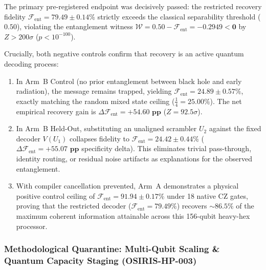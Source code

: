 \documentclass[aps,preprint,superscriptaddress,longbibliography]{revtex4-2}
\begin{document}
The primary pre-registered endpoint was decisively passed: the restricted recovery fidelity $\mathcal{F}_{\mathrm{ent}} = \mathbf{79.49 \pm 0.14\%}$ strictly exceeds the classical separability threshold ($0.50$), violating the entanglement witness $\mathcal{W} = 0.50 - \mathcal{F}_{\mathrm{ent}} = \mathbf{-0.2949 < 0}$ by $Z > 200\sigma$ ($p < 10^{-100}$). 

Crucially, both negative controls confirm that recovery is an active quantum decoding process:
\begin{enumerate}
\item In Arm~B Control (no prior entanglement between black hole and early radiation), the message remains trapped, yielding $\mathcal{F}_{\mathrm{ent}} = 24.89 \pm 0.57\%$, exactly matching the random mixed state ceiling ($\frac{1}{4} = 25.00\%$). The net empirical recovery gain is $\Delta \mathcal{F}_{\mathrm{ent}} = \mathbf{+54.60\text{ pp}}$ ($Z = 92.5\sigma$).
\item In Arm~B Held-Out, substituting an unaligned scrambler $U_2$ against the fixed decoder $V(U_1)$ collapses fidelity to $\mathcal{F}_{\mathrm{ent}} = 24.42 \pm 0.44\%$ ($\Delta \mathcal{F}_{\mathrm{ent}} = \mathbf{+55.07\text{ pp}}$ specificity delta). This eliminates trivial pass-through, identity routing, or residual noise artifacts as explanations for the observed entanglement.
\item With compiler cancellation prevented, Arm~A demonstrates a physical positive control ceiling of $\mathcal{F}_{\mathrm{ent}} = \mathbf{91.94 \pm 0.17\%}$ under 18 native CZ gates, proving that the restricted decoder ($\mathcal{F}_{\mathrm{ent}} = 79.49\%$) recovers $\sim 86.5\%$ of the maximum coherent information attainable across this 156-qubit heavy-hex processor.
\end{enumerate}

\subsubsection{Methodological Quarantine: Multi-Qubit Scaling \& Quantum Capacity Staging (OSIRIS-HP-003)}
\label{sec:hp_multiqubit}
\end{document}
